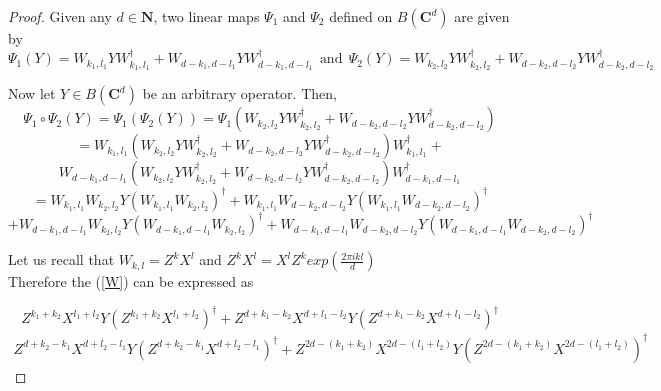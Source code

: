 \documentclass[12pt]{amsart}
\numberwithin{equation}{section}
\begin{document}
\begin{proof}
    Given any $d\in \mathbf{N}$, two linear maps $\Psi_1$ and $\Psi_2$ defined on $B\left(\mathbf{C}^d\right)$ are given by
    \[\Psi_1 (Y)=W_{k_1,l_1} Y W^{\dagger}_{k_1,l_1} + W_{d-k_1,d-l_1} Y W^{\dagger}_{d-k_1,d-l_1} ~~\text{and}~~\Psi_2 (Y)=W_{k_2,l_2} Y W^{\dagger}_{k_2,l_2} + W_{d-k_2,d-l_2} Y W^{\dagger}_{d-k_2,d-l_2}\]

    Now let $Y \in B\left(\mathbf{C}^d\right)$ be an arbitrary operator. Then,
    \[\Psi_1 \circ \Psi_2  (Y)=\Psi_1 \left( \Psi_2 (Y)\right)=\Psi_1 \left( W_{k_2,l_2} Y W^{\dagger}_{k_2,l_2} + W_{d-k_2,d-l_2} Y W^{\dagger}_{d-k_2,d-l_2} \right)\]
    \[=W_{k_1,l_1} \left(W_{k_2,l_2} Y W^{\dagger}_{k_2,l_2} + W_{d-k_2,d-l_2} Y W^{\dagger}_{d-k_2,d-l_2}  \right)W^{\dagger}_{k_1,l_1} +\]
    \[W_{d-k_1,d-l_1} \left( W_{k_2,l_2} Y W^{\dagger}_{k_2,l_2} + W_{d-k_2,d-l_2} Y W^{\dagger}_{d-k_2,d-l_2}\right) W^{\dagger}_{d-k_1,d-l_1}  \]
    \[=W_{k_1,l_1} W_{k_2,l_2} Y \left(W_{k_1,l_1} W_{k_2,l_2} \right)^{\dagger}+ W_{k_1,l_1} W_{d-k_2,d-l_2} Y \left(W_{k_1,l_1} W_{d-k_2,d-l_2} \right)^{\dagger}\]
        \begin{equation} \label{W}
        +
        W_{d-k_1,d-l_1} W_{k_2,l_2} Y \left(W_{d-k_1,d-l_1} W_{k_2,l_2} \right)^{\dagger} + W_{d-k_1,d-l_1} W_{d-k_2,d-l_2} Y \left(W_{d-k_1,d-l_1} W_{d-k_2,d-l_2} \right)^{\dagger}
    \end{equation}
    
    
    
\vspace{0.3cm}

    Let us recall that $W_{k,l}=Z^k X^l$ and $Z^k X^l=X^lZ^k exp \left( \frac{2 \pi i k l}{d}\right) $\\

    Therefore the (\ref{W}) can be expressed as
    
        \[Z^{k_1+k_2} X^{l_1+l_2} Y \left(Z^{k_1+k_2} X^{l_1+l_2} \right)^{\dagger}+Z^{d+k_1-k_2} X^{d+l_1-l_2} Y \left(Z^{d+k_1-k_2} X^{d+l_1-l_2} \right)^{\dagger}\]
        \begin{eqnarray*}
        Z^{d+k_2-k_1} X^{d+l_2-l_1} Y \left(Z^{d+k_2-k_1} X^{d+l_2-l_1}\right)^{\dagger} + Z^{2d-(k_1+k_2)} X^{2d-(l_1+l_2)} Y \left(Z^{2d-(k_1+k_2)} X^{2d-(l_1+l_2)} \right)^{\dagger} 
    \end{eqnarray*}


\end{proof}
\end{document}
